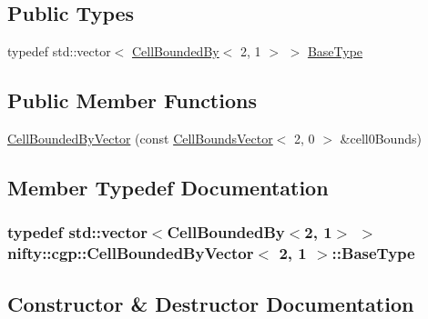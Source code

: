 \subsection*{Public Types}
\begin{DoxyCompactItemize}
\item 
typedef std\+::vector$<$ \hyperlink{classnifty_1_1cgp_1_1CellBoundedBy}{Cell\+Bounded\+By}$<$ 2, 1 $>$ $>$ \hyperlink{classnifty_1_1cgp_1_1CellBoundedByVector_3_012_00_011_01_4_ae67b7b5bea502cf53791b047577eff16}{Base\+Type}
\end{DoxyCompactItemize}
\subsection*{Public Member Functions}
\begin{DoxyCompactItemize}
\item 
\hyperlink{classnifty_1_1cgp_1_1CellBoundedByVector_3_012_00_011_01_4_a234e9640290d247f90261787b95fcc90}{Cell\+Bounded\+By\+Vector} (const \hyperlink{classnifty_1_1cgp_1_1CellBoundsVector}{Cell\+Bounds\+Vector}$<$ 2, 0 $>$ \&cell0\+Bounds)
\end{DoxyCompactItemize}


\subsection{Member Typedef Documentation}
\hypertarget{classnifty_1_1cgp_1_1CellBoundedByVector_3_012_00_011_01_4_ae67b7b5bea502cf53791b047577eff16}{}
\subsubsection[{Base\+Type}]{\setlength{\rightskip}{0pt plus 5cm}typedef std\+::vector$<${\bf Cell\+Bounded\+By}$<$2, 1$>$ $>$ {\bf nifty\+::cgp\+::\+Cell\+Bounded\+By\+Vector}$<$ 2, 1 $>$\+::{\bf Base\+Type}}\label{classnifty_1_1cgp_1_1CellBoundedByVector_3_012_00_011_01_4_ae67b7b5bea502cf53791b047577eff16}


\subsection{Constructor \& Destructor Documentation}
\hypertarget{classnifty_1_1cgp_1_1CellBoundedByVector_3_012_00_011_01_4_a234e9640290d247f90261787b95fcc90}{}
